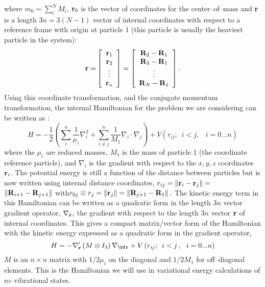 where $m_0=\sum_i^NM_i$. ${\bf r}_0$ is the vector of coordinates for the
center--of--mass and ${\bf r}$ is a length $3n=3\left( N-1\right) $ vector
of internal coordinates with respect to a reference frame with origin at
particle 1 (this particle is usually the heaviest particle in the system):
\begin{equation}
{\bf r=}\left[ 
\begin{array}{c}
{\bf r}_1 \\ 
{\bf r}_2 \\ 
\vdots  \\ 
{\bf r}_n
\end{array}
\right] =\left[ 
\begin{array}{c}
{\bf R}_2-{\bf R}_1 \\ 
{\bf R}_3-{\bf R}_1 \\ 
\vdots  \\ 
{\bf R}_N-{\bf R}_1
\end{array}
\right] .  \label{rdef}
\end{equation}
Using this coordinate transformation, and the conjugate momentum
transformation, the internal Hamiltonian for the problem 
we are considering
can be written as \cite{Kinghorn93,Kinghorn95b}: 
\begin{equation}
H=-\frac 12\left( \sum_i^n\frac 1{\mu _i}\nabla _i^2+\sum_{i\neq j}^n\frac
1{M_1}\nabla _i\cdot \nabla _j\right) +V\left(
r_{ij};\,\,\,i<j,\,\,\,\,\,i=0...n\right)   \label{intham1}
\end{equation}
where the $\mu _i$ are reduced masses, $M_1$ is the mass of particle 1 (the
coordinate reference particle), and $\nabla _i$ is the gradient with respect
to the $x,y,z$ coordinates ${\bf r}_i$. The potential energy is still a
function of the distance between particles but is now written using internal
distance coordinates, $r_{ij}=\left\| {\bf r}_i-{\bf r}_j\right\| =$ $%
\left\| {\bf R}_{i+1}-{\bf R}_{j+1}\right\| \,\,$with\thinspace $%
r_{0j}\equiv r_j=\left\| {\bf r}_j\right\| =\left\| {\bf R}_{j+1}-%
{\bf R}_1\right\| .$ The kinetic energy term in this Hamiltonian can be
written as a quadratic form in the length $3n$ vector gradient operator, $%
\nabla _{{\bf r}},$ the gradient with respect to the length $3n$ vector $%
{\bf r}$ of internal coordinates. This gives a compact matrix/vector form
of the Hamiltonian with the kinetic energy expressed as a quadratic form in
the gradient operator, 
\begin{equation}
H=-\nabla _{{\bf r}}^{\prime }\left( M\otimes I_3\right) \nabla _{{\bf%
r}}+V\left( r_{ij};\,\,\,i<j\,,\,\,\,\,i=0...n\right)   \label{ham}
\end{equation}
$M$ is an $n\times n$ matrix with $1/2\mu _i$ on the diagonal and $1/2M_1$
for off--diagonal elements. This is the Hamiltonian we 
will use in variational
energy calculations of ro--vibrational states. 

